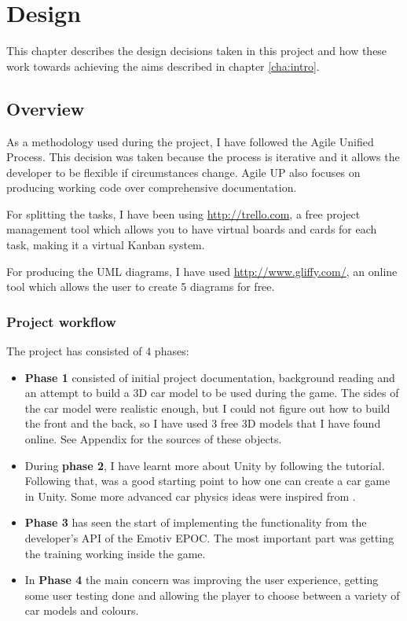 \chapter{Design}
\label{cha:design}

This chapter describes the design decisions taken in this project and how these work towards achieving the aims described in chapter \ref{cha:intro}.

\section{Overview}
As a methodology used during the project, I have followed the Agile Unified Process. This decision was taken because the process is iterative and it allows the developer to be flexible if circumstances change. Agile UP also focuses on producing working code over comprehensive documentation.

For splitting the tasks, I have been using \url{http://trello.com}, a free project management tool which allows you to have virtual boards and cards for each task, making it a virtual Kanban system.

For producing the UML diagrams, I have used \url{http://www.gliffy.com/}, an online tool which allows the user to create 5 diagrams for free.

\subsection{Project workflow}
The project has consisted of 4 phases:
\begin{itemize}
	\item \textbf{Phase 1} consisted of initial project documentation, background reading and an attempt to build a 3D car model to be used during the game. The sides of the car model were realistic enough, but I could not figure out how to build the front and the back, so I have used 3 free 3D models that I have found online. See Appendix for the sources of these objects.
	\item During \textbf{phase 2}, I have learnt more about Unity by following the \cite{walkerboys} tutorial. Following that, \cite{flattutorials} was a good starting point to how one can create a car game in Unity. Some more advanced car physics ideas were inspired from \cite{carphysics}.
	\item \textbf{Phase 3} has seen the start of implementing the functionality from the developer's API of the Emotiv EPOC. The most important part was getting the training working inside the game.
	\item In \textbf{Phase 4} the main concern was improving the user experience, getting some user testing done and allowing the player to choose between a variety of car models and colours.
\end{itemize}

